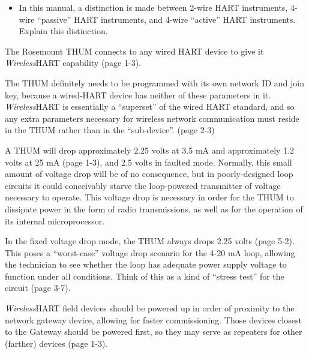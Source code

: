 \begin{itemize}
\item{} In this manual, a distinction is made between 2-wire HART instruments, 4-wire ``passive'' HART instruments, and 4-wire ``active'' HART instruments.  Explain this distinction.
\end{itemize}














The Rosemount THUM connects to any wired HART device to give it {\sl Wireless}HART capability (page 1-3).

\vskip 10pt

The THUM definitely needs to be programmed with its own network ID and join key, because a wired-HART device has neither of these parameters in it.  {\sl Wireless}HART is essentially a ``superset'' of the wired HART standard, and so any extra parameters necessary for wireless network communication must reside in the THUM rather than in the ``sub-device''.  (page 2-3)

\vskip 10pt

A THUM will drop approximately 2.25 volts at 3.5 mA and approximately 1.2 volts at 25 mA (page 1-3), and 2.5 volts in faulted mode.  Normally, this small amount of voltage drop will be of no consequence, but in poorly-designed loop circuits it could conceivably starve the loop-powered transmitter of voltage necessary to operate.  This voltage drop is necessary in order for the THUM to dissipate power in the form of radio transmissions, as well as for the operation of its internal microprocessor.

\vskip 10pt

In the fixed voltage drop mode, the THUM always drops 2.25 volts (page 5-2).  This poses a ``worst-case'' voltage drop scenario for the 4-20 mA loop, allowing the technician to see whether the loop has adequate power supply voltage to function under all conditions.  Think of this as a kind of ``stress test'' for the circuit (page 3-7).

\vskip 10pt

{\it Wireless}HART field devices should be powered up in order of proximity to the network gateway device, allowing for faster commissioning.  Those devices closest to the Gateway should be powered first, so they may serve as repeaters for other (farther) devices (page 1-3).

